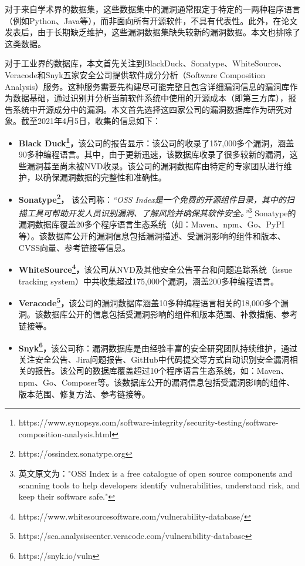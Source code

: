 对于来自学术界的数据集\cite{ponta2019manually,fan2020ac,jimenez2018enabling,gkortzis2018vulinoss,namrud2019androvul,li2017large,liu2020large,antal2020exploring}，这些数据集中的漏洞通常限定于特定的一两种程序语言（例如Python、Java等），而非面向所有开源软件，不具有代表性。此外，在论文发表后，由于长期缺乏维护，这些漏洞数据集缺失较新的漏洞数据。本文也排除了这类数据。

对于工业界的数据库，本文首先关注到BlackDuck、Sonatype、WhiteSource、Veracode和Snyk五家安全公司提供软件成分分析（Software Composition Analysis）服务。这种服务需要先构建尽可能完整且包含详细漏洞信息的漏洞库作为数据基础，通过识别并分析当前软件系统中使用的开源成本（即第三方库），报告系统中开源成分中的漏洞。本文首先选择这四家公司的漏洞数据库作为研究对象。截至2021年4月5日，收集的信息如下：

\begin{itemize}[leftmargin=*]
\item\textbf{Black Duck\footnote{https://www.synopsys.com/software-integrity/security-testing/software-composition-analysis.html}，}该公司的报告显示：该公司的收录了157,000多个漏洞，涵盖90多种编程语言。其中，由于更新迅速，该数据库收录了很多较新的漏洞，这些漏洞甚至尚未被NVD收录。该公司的漏洞数据库由特定的专家团队进行维护，以确保漏洞数据的完整性和准确性。%
\item\textbf{Sonatype\footnote{https://ossindex.sonatype.org}，} 该公司称：\textit{“OSS Index是一个免费的开源组件目录，其中的扫描工具可帮助开发人员识别漏洞、了解风险并确保其软件安全。”}\footnote{英文原文为："OSS Index is a free catalogue of open source components and scanning tools to help developers identify vulnerabilities, understand risk, and keep their software safe."} Sonatype的漏洞数据库覆盖20多个程序语言生态系统（如：Maven、npm、Go、PyPI等）。该数据库公开的漏洞信息包括漏洞描述、受漏洞影响的组件和版本、CVSS向量、参考链接等信息。
\item\textbf{WhiteSource\footnote{https://www.whitesourcesoftware.com/vulnerability-database/}，}该公司从NVD及其他安全公告平台和问题追踪系统（issue tracking system）中共收集超过175,000个漏洞，涵盖200多种编程语言。
\item\textbf{Veracode\footnote{https://sca.analysiscenter.veracode.com/vulnerability-database}，}该公司的漏洞数据库涵盖10多种编程语言相关的18,000多个漏洞。该数据库公开的信息包括受漏洞影响的组件和版本范围、补救措施、参考链接等。
\item\textbf{Snyk\footnote{https://snyk.io/vuln}，}该公司称：漏洞数据库是由经验丰富的安全研究团队持续维护，通过关注安全公告、Jira问题报告、GitHub中代码提交等方式自动识别安全漏洞相关的报告。该公司的数据库覆盖超过10个程序语言生态系统，如：Maven、npm、Go、Composer等。该数据库公开的漏洞信息包括受漏洞影响的组件、版本范围、修复方法、参考链接等。
\end{itemize}

